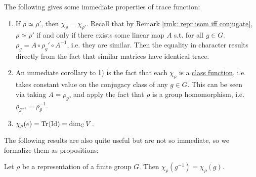 \documentclass{article}
\begin{document}
\textstart
The following gives some immediate properties of trace function:
\begin{enumerate}[label=\arabic*)]
    \item If $\rho \simeq \rho'$, then $\chi_{\rho} = \chi_{\rho'}$. Recall that by Remark \ref{rmk: repr isom iff conjugate}, $\rho \simeq \rho'$ if and only if there exists some linear map $A$ s.t. for all $g \in G$. $\rho_g = A \circ \rho_g' \circ A^{-1}$, i.e. they are similar. Then the equality in character results directly from the fact that similar matrices have identical trace.
    \item An immediate corollary to 1) is the fact that each $\chi_{\rho}$ is a \underline{class function}, i.e. takes constant value on the conjugacy class of any $g \in G$. This can be seen via taking $A = \rho_g$, and apply the fact that $\rho$ is a group homomorphism, i.e. $\rho_{g^{-1}} = \rho_g^{-1}$.
    \item $\chi_{\rho}(e) = \mathrm{Tr}(\mathrm{Id}) = \dim_{\mathbb{C}} V$.
\end{enumerate}

\textstart
The following results are also quite useful but are not so immediate, so we formalize them as propositions:
\begin{proposition}\label{prop: character of inverse of conjugate of character}
    Let $\rho$ be a representation of a finite group $G$. Then $\chi_{\rho}(g^{-1}) = \overline{\chi_{\rho}(g)}$.
\end{proposition}
\end{document}
